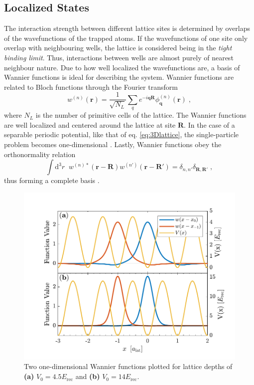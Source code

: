 \subsection{Localized States}
The interaction strength between different lattice sites is determined by overlaps of the wavefunctions of the trapped atoms.
If the wavefunctions of one site only overlap with neighbouring wells, the lattice is considered being in the \textit{tight binding limit}. Thus, interactions between wells are almost purely of nearest neighbour nature. Due to how well localized the wavefunctions are, a basis of Wannier functions is ideal for describing the system. Wannier functions are related to Bloch functions through the Fourier transform \cite{kittel1963}
\begin{equation}
	w^{(n)}(\boldsymbol{r}) = \frac{1}{\sqrt{N_L}} \sum_{q} e^{ -i \boldsymbol{q} \boldsymbol{R} } \phi_{\boldsymbol{q}}^{(n)}(\boldsymbol{r}) \; ,
\end{equation} 
where $N_L$ is the number of primitive cells of the lattice. The Wannier functions are well localized and centered around the lattice at site $\boldsymbol{R}$. In the case of a separable periodic potential, like that of eq. \eqref{eq:3Dlattice}, the single-particle problem becomes one-dimensional \cite{kohn1959analyticWannier}. Lastly, Wannier functions obey the orthonormality relation
\begin{equation}
	\int \mathrm{d^3}r \; \; w^{(n) *}(\boldsymbol{r} - \boldsymbol{R}) w^{(n')}(\boldsymbol{r} - \boldsymbol{R'}) = \delta_{n,n'} \delta_{\boldsymbol{R},\boldsymbol{R}'} \; ,
\end{equation}
thus forming a complete basis \cite{manybodyBloch}. 
\begin{figure}[!h]
	\centering
	\includegraphics[width=0.8\columnwidth]{Figures/WannierFunctions.pdf} 
	\caption{Two one-dimensional Wannier functions plotted for lattice depths of \textbf{(a)} $V_0 = 4.5 E_{\mathrm{rec}}$ and \textbf{(b)} $V_0 = 14 E_{\mathrm{rec}}$.}
	\label{fig:WannierPlot} 
\end{figure}
